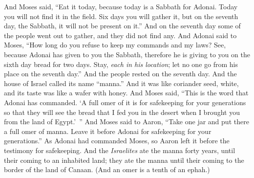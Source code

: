 \begin{biblechapter}
\verse And Moses said, “Eat it today, because today is a Sabbath for Adonai. Today you will not find it in the field.
\verse Six days you will gather it, but on the seventh day, the Sabbath, it will not be present on it.”
\verse And on the seventh day some of the people went out to gather, and they did not find any.
\verse And Adonai said to Moses, “How long do you refuse to keep my commands and my laws?
\verse See, because Adonai has given to you the Sabbath, therefore he is giving to you on the sixth day bread for two days. Stay, \textit{each in his location}; let no one go from his place on the seventh day.”
\verse And the people rested on the seventh day.
\verse And the house of Israel called its name “manna.” And it was like coriander seed, white, and its taste was like a wafer with honey.
\verse And Moses said, “This is the word that Adonai has commanded. ‘A full omer of it is for safekeeping for your generations so that they will see the bread that I fed you in the desert when I brought you from the land of Egypt.’ ”
\verse And Moses said to Aaron, “Take one jar and put there a full omer of manna. Leave it before Adonai for safekeeping for your generations.”
\verse As Adonai had commanded Moses, so Aaron left it before the testimony for safekeeping.
\verse And the \textit{Israelites} ate the manna forty years, until their coming to an inhabited land; they ate the manna until their coming to the border of the land of Canaan.
\verse (And an omer is a tenth of an ephah.)
\end{biblechapter}

